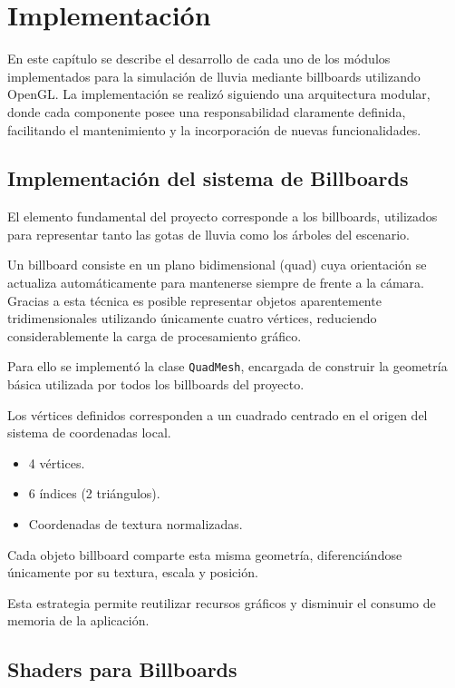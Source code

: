 \chapter{Implementación}

En este capítulo se describe el desarrollo de cada uno de los módulos implementados para la simulación de lluvia mediante billboards utilizando OpenGL. La implementación se realizó siguiendo una arquitectura modular, donde cada componente posee una responsabilidad claramente definida, facilitando el mantenimiento y la incorporación de nuevas funcionalidades.

\section{Implementación del sistema de Billboards}

El elemento fundamental del proyecto corresponde a los billboards, utilizados para representar tanto las gotas de lluvia como los árboles del escenario.

Un billboard consiste en un plano bidimensional (quad) cuya orientación se actualiza automáticamente para mantenerse siempre de frente a la cámara. Gracias a esta técnica es posible representar objetos aparentemente tridimensionales utilizando únicamente cuatro vértices, reduciendo considerablemente la carga de procesamiento gráfico.

Para ello se implementó la clase \texttt{QuadMesh}, encargada de construir la geometría básica utilizada por todos los billboards del proyecto.

Los vértices definidos corresponden a un cuadrado centrado en el origen del sistema de coordenadas local.

\begin{itemize}
\item 4 vértices.
\item 6 índices (2 triángulos).
\item Coordenadas de textura normalizadas.
\end{itemize}

Cada objeto billboard comparte esta misma geometría, diferenciándose únicamente por su textura, escala y posición.

Esta estrategia permite reutilizar recursos gráficos y disminuir el consumo de memoria de la aplicación.



\section{Shaders para Billboards}

